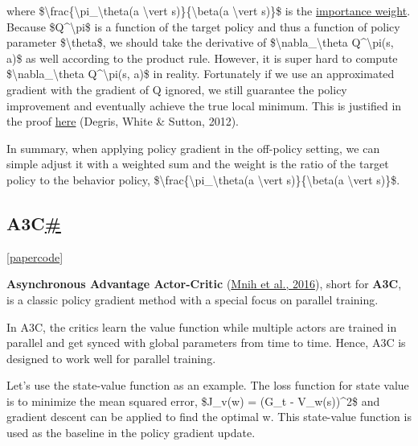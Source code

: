 where \$\textbackslash frac\{\textbackslash pi\_\textbackslash theta(a \textbackslash vert s)\}\{\textbackslash beta(a \textbackslash vert s)\}\$ is the \href{http://timvieira.github.io/blog/post/2014/12/21/importance-sampling/}{importance weight}. Because \$Q\^{}\textbackslash pi\$ is a function of the target policy and thus a function of policy parameter \$\textbackslash theta\$, we should take the derivative of \$\textbackslash nabla\_\textbackslash theta Q\^{}\textbackslash pi(s, a)\$ as well according to the product rule. However, it is super hard to compute \$\textbackslash nabla\_\textbackslash theta Q\^{}\textbackslash pi(s, a)\$ in reality. Fortunately if we use an approximated gradient with the gradient of Q ignored, we still guarantee the policy improvement and eventually achieve the true local minimum. This is justified in the proof \href{https://arxiv.org/pdf/1205.4839.pdf}{here} (Degris, White \& Sutton, 2012).

In summary, when applying policy gradient in the off-policy setting, we can simple adjust it with a weighted sum and the weight is the ratio of the target policy to the behavior policy, \$\textbackslash frac\{\textbackslash pi\_\textbackslash theta(a \textbackslash vert s)\}\{\textbackslash beta(a \textbackslash vert s)\}\$.

\subsection{\texorpdfstring{A3C\hyperref[a3c]{\#}}{A3C\#}}\label{a3c}

{[}\href{https://arxiv.org/abs/1602.01783}{paper}\textbar{}\href{https://github.com/dennybritz/reinforcement-learning/tree/master/PolicyGradient/a3c}{code}{]}

\textbf{Asynchronous Advantage Actor-Critic} (\href{https://arxiv.org/abs/1602.01783}{Mnih et al., 2016}), short for \textbf{A3C}, is a classic policy gradient method with a special focus on parallel training.

In A3C, the critics learn the value function while multiple actors are trained in parallel and get synced with global parameters from time to time. Hence, A3C is designed to work well for parallel training.

Let's use the state-value function as an example. The loss function for state value is to minimize the mean squared error, \$J\_v(w) = (G\_t - V\_w(s))\^{}2\$ and gradient descent can be applied to find the optimal w. This state-value function is used as the baseline in the policy gradient update.

